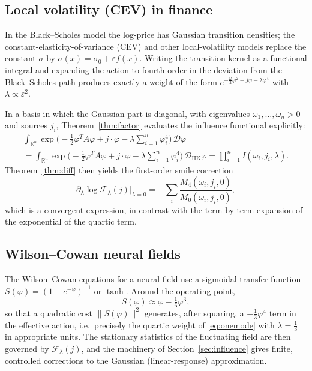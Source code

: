 \documentclass[11pt,a4paper]{article}
\theoremstyle{plain}
\theoremstyle{definition}
\theoremstyle{remark}
\newcommand{\dphi}{\mathcal{D}\varphi}
\newcommand{\dhk}{\mathcal{D}_{\mathrm{HK}}\varphi}
\newcommand{\R}{\mathbb{R}}
\begin{document}
\subsection{Local volatility (CEV) in finance}

In the Black--Scholes model the log-price has Gaussian transition densities; the
constant-elasticity-of-variance (CEV) and other local-volatility models replace the
constant $\sigma$ by $\sigma(x)=\sigma_0+\varepsilon f(x)$. Writing the transition kernel
as a functional integral and expanding the action to fourth order in the deviation from
the Black--Scholes path produces exactly a weight of the form
$e^{-\frac{\omega}{2}\varphi^{2}+j\varphi-\lambda\varphi^{4}}$ with
$\lambda\propto\varepsilon^{2}$.

In a basis in which the Gaussian part is diagonal, with eigenvalues
$\omega_1,\dots,\omega_n>0$ and sources $j_i$, Theorem~\ref{thm:factor} evaluates the
influence functional explicitly:
\begin{multline*}
\int_{\R^{n}}\exp\!\Big(-\frac12\varphi^{T}A\varphi+j\cdot\varphi
  -\lambda\sum_{i=1}^{n}\varphi_i^{4}\Big)\,\dphi\\
=\int_{\R^{n}}\exp\!\Big(-\frac12\varphi^{T}A\varphi+j\cdot\varphi
  -\lambda\sum_{i=1}^{n}\varphi_i^{4}\Big)\,\dhk
=\prod_{i=1}^{n} I(\omega_i,j_i,\lambda).
\end{multline*}
 Theorem~\ref{thm:diff} then yields the first-order
smile correction
\[
\partial_\lambda \log \mathcal{F}_\lambda(j)\big|_{\lambda=0}
=-\sum_i \frac{M_4(\omega_i,j_i,0)}{M_0(\omega_i,j_i,0)},
\]
which is a convergent expression, in contrast with the term-by-term expansion of the
exponential of the quartic term.

\subsection{Wilson--Cowan neural fields}

The Wilson--Cowan equations for a neural field use a sigmoidal transfer function
$S(\varphi)=(1+e^{-\varphi})^{-1}$ or $\tanh$. Around the operating point,
\[
S(\varphi)\approx \varphi-\tfrac16\varphi^{3},
\]
so that a quadratic cost $\|S(\varphi)\|^{2}$ generates, after squaring, a
$-\tfrac13\varphi^{4}$ term in the effective action, i.e.\ precisely the quartic weight
of \eqref{eq:onemode} with $\lambda=\tfrac13$ in appropriate units. The stationary
statistics of the fluctuating field are then governed by $\mathcal{F}_\lambda(j)$, and
the machinery of Section~\ref{sec:influence} gives finite, controlled corrections to the
Gaussian (linear-response) approximation.
\end{document}
